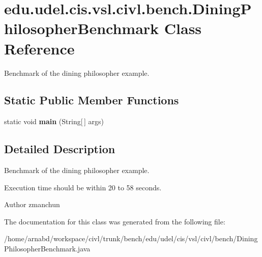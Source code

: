 \hypertarget{classedu_1_1udel_1_1cis_1_1vsl_1_1civl_1_1bench_1_1DiningPhilosopherBenchmark}{}\section{edu.\+udel.\+cis.\+vsl.\+civl.\+bench.\+Dining\+Philosopher\+Benchmark Class Reference}
\label{classedu_1_1udel_1_1cis_1_1vsl_1_1civl_1_1bench_1_1DiningPhilosopherBenchmark}


Benchmark of the dining philosopher example.  


\subsection*{Static Public Member Functions}
\begin{DoxyCompactItemize}
\item 
\hypertarget{classedu_1_1udel_1_1cis_1_1vsl_1_1civl_1_1bench_1_1DiningPhilosopherBenchmark_ab9f506c678b2d9785f3573d72b0f5e46}{}static void {\bfseries main} (String\mbox{[}$\,$\mbox{]} args)\label{classedu_1_1udel_1_1cis_1_1vsl_1_1civl_1_1bench_1_1DiningPhilosopherBenchmark_ab9f506c678b2d9785f3573d72b0f5e46}

\end{DoxyCompactItemize}


\subsection{Detailed Description}
Benchmark of the dining philosopher example. 

Execution time should be within 20 to 58 seconds.

\begin{DoxyAuthor}{Author}
zmanchun 
\end{DoxyAuthor}


The documentation for this class was generated from the following file\+:\begin{DoxyCompactItemize}
\item 
/home/arnabd/workspace/civl/trunk/bench/edu/udel/cis/vsl/civl/bench/Dining\+Philosopher\+Benchmark.\+java\end{DoxyCompactItemize}

